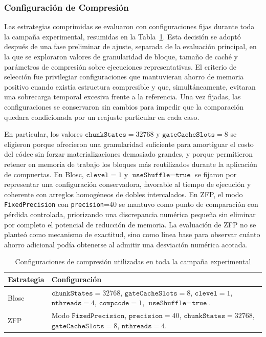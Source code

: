 \subsubsection{Configuración de Compresión}

Las estrategias comprimidas se evaluaron con configuraciones fijas durante toda la campaña experimental, resumidas en la Tabla~\ref{tab:exp-configs}. Esta decisión se adoptó después de una fase preliminar de ajuste, separada de la evaluación principal, en la que se exploraron valores de granularidad de bloque, tamaño de caché y parámetros de compresión sobre ejecuciones representativas. El criterio de selección fue privilegiar configuraciones que mantuvieran ahorro de memoria positivo cuando existía estructura compresible y que, simultáneamente, evitaran una sobrecarga temporal excesiva frente a la referencia. Una vez fijadas, las configuraciones se conservaron sin cambios para impedir que la comparación quedara condicionada por un reajuste particular en cada caso.

En particular, los valores $\texttt{chunkStates}=32768$ y $\texttt{gateCacheSlots}=8$ se eligieron porque ofrecieron una granularidad suficiente para amortiguar el costo del códec sin forzar materializaciones demasiado grandes, y porque permitieron retener en memoria de trabajo los bloques más reutilizados durante la aplicación de compuertas. En Blosc, $\texttt{clevel}=1$ y $\texttt{useShuffle}=\texttt{true}$ se fijaron por representar una configuración conservadora, favorable al tiempo de ejecución y coherente con arreglos homogéneos de dobles intercalados. En ZFP, el modo \texttt{FixedPrecision} con \texttt{precision}=40 se mantuvo como punto de comparación con pérdida controlada, priorizando una discrepancia numérica pequeña sin eliminar por completo el potencial de reducción de memoria. La evaluación de ZFP no se planteó como mecanismo de exactitud, sino como línea base para observar cuánto ahorro adicional podía obtenerse al admitir una desviación numérica acotada.

\begin{table}[H]
    \centering
    \small
    \caption{Configuraciones de compresión utilizadas en toda la campaña experimental}
    \label{tab:exp-configs}
    \begin{tabular}{>{\raggedright\arraybackslash}p{2.1cm}>{\raggedright\arraybackslash}p{9.2cm}}
        \hline
        \textbf{Estrategia} & \textbf{Configuración} \\
        \hline
        Blosc & $\texttt{chunkStates}=32768$, $\texttt{gateCacheSlots}=8$, $\texttt{clevel}=1$, $\texttt{nthreads}=4$, $\texttt{compcode}=1$, $\texttt{useShuffle}=\texttt{true}$. \\
        ZFP & Modo $\texttt{FixedPrecision}$, $\texttt{precision}=40$, $\texttt{chunkStates}=32768$, $\texttt{gateCacheSlots}=8$, $\texttt{nthreads}=4$. \\
        \hline
    \end{tabular}
\end{table}

